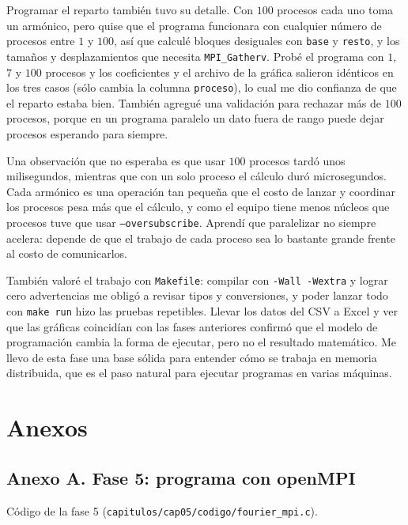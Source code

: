 Programar el reparto también tuvo su detalle. Con $100$ procesos cada uno toma un armónico, pero quise que el programa funcionara con cualquier número de procesos entre $1$ y $100$, así que calculé bloques desiguales con \texttt{base} y \texttt{resto}, y los tamaños y desplazamientos que necesita \texttt{MPI\_Gatherv}. Probé el programa con $1$, $7$ y $100$ procesos y los coeficientes y el archivo de la gráfica salieron idénticos en los tres casos (sólo cambia la columna \texttt{proceso}), lo cual me dio confianza de que el reparto estaba bien. También agregué una validación para rechazar más de $100$ procesos, porque en un programa paralelo un dato fuera de rango puede dejar procesos esperando para siempre.

Una observación que no esperaba es que usar $100$ procesos tardó unos milisegundos, mientras que con un solo proceso el cálculo duró microsegundos. Cada armónico es una operación tan pequeña que el costo de lanzar y coordinar los procesos pesa más que el cálculo, y como el equipo tiene menos núcleos que procesos tuve que usar \texttt{--oversubscribe}. Aprendí que paralelizar no siempre acelera: depende de que el trabajo de cada proceso sea lo bastante grande frente al costo de comunicarlos.

También valoré el trabajo con \texttt{Makefile}: compilar con \texttt{-Wall -Wextra} y lograr cero advertencias me obligó a revisar tipos y conversiones, y poder lanzar todo con \texttt{make run} hizo las pruebas repetibles. Llevar los datos del CSV a Excel y ver que las gráficas coincidían con las fases anteriores confirmó que el modelo de programación cambia la forma de ejecutar, pero no el resultado matemático. Me llevo de esta fase una base sólida para entender cómo se trabaja en memoria distribuida, que es el paso natural para ejecutar programas en varias máquinas.

\clearpage

\section{Anexos}
\label{sec:cap05:anexos}

\subsection*{Anexo A. Fase 5: programa con openMPI}
Código de la fase 5 (\texttt{capitulos/cap05/codigo/fourier\_mpi.c}).

